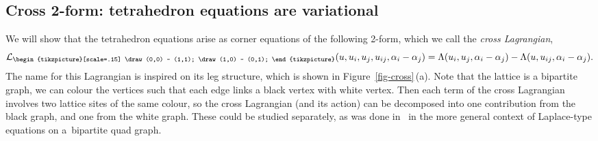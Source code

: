 \documentclass[10pt,a4paper]{amsart}
\newcommand{\cross}{{\begin{tikzpicture}[scale=.15]
			\draw (0,0) -- (1,1);
			\draw (1,0) -- (0,1);
\end{tikzpicture}}}
\newcommand{\cL}{\mathcal{L}}
\numberwithin{equation}{section}
\begin{document}
\subsection{Cross 2-form: tetrahedron equations are variational}
\label{sec-cross}

We will show that the tetrahedron equations arise as corner equations of the following 2-form, which we call the \emph{cross Lagrangian},
\[
 \cL_\cross(u,u_i,u_j,u_{ij},\alpha_i-\alpha_j) = \Lambda(u_i, u_j,\alpha_i-\alpha_j) - \Lambda(u, u_{ij},\alpha_i-\alpha_j) .
\]
The name for this Lagrangian is inspired on its leg structure, which is shown in Figure~\ref{fig-cross}\,(a). Note that the lattice is a bipartite graph, we can colour the vertices such that each edge links a black vertex with white vertex. Then each term of the cross Lagrangian involves two lattice sites of the same colour, so the cross Lagrangian (and its action) can be decomposed into one contribution from the black graph, and one from the white graph. These could be studied separately, as was done in~\cite{bobenko2012discrete, bobenko2010lagrangian} in the more general context of Laplace-type equations on a~bipartite quad graph.
\end{document}
